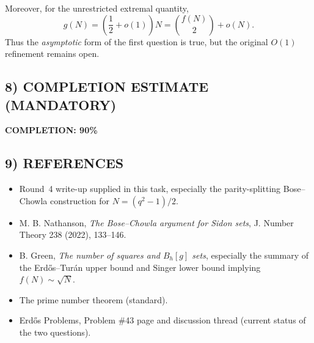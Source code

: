 Moreover, for the unrestricted extremal quantity,
\[
g(N)=\left(\frac12+o(1)\right)N=\binom{f(N)}2+o(N).
\]
Thus the \emph{asymptotic} form of the first question is true, but the original $O(1)$ refinement remains open.

\subsection{8) COMPLETION ESTIMATE (MANDATORY)}

\textbf{COMPLETION: 90\%}

\subsection{9) REFERENCES}

\begin{itemize}
\item Round~4 write-up supplied in this task, especially the parity-splitting Bose--Chowla construction for $N=(q^2-1)/2$.
\item M. B. Nathanson, \emph{The Bose--Chowla argument for Sidon sets}, J. Number Theory 238 (2022), 133--146.
\item B. Green, \emph{The number of squares and $B_h[g]$ sets}, especially the summary of the Erd\H{o}s--Tur\'an upper bound and Singer lower bound implying $f(N)\sim \sqrt N$.
\item The prime number theorem (standard).
\item Erd\H{o}s Problems, Problem \#43 page and discussion thread (current status of the two questions).
\end{itemize}
